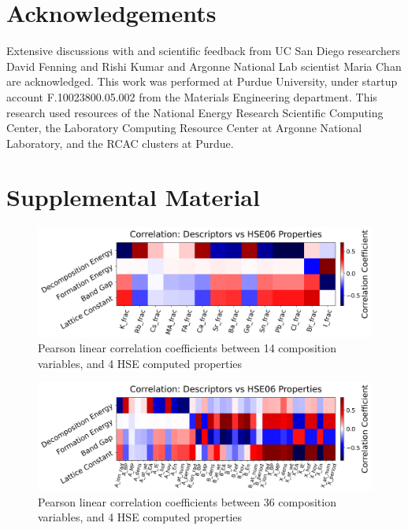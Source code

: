 \documentclass[twoside, twocolumn, 9pt, draft]{article}
\begin{document}
\section*{Acknowledgements}
\label{sec:org5936278}
Extensive discussions with and scientific feedback from UC San Diego
researchers David Fenning and Rishi Kumar and Argonne National Lab
scientist Maria Chan are acknowledged. This work was performed at
Purdue University, under startup account F.10023800.05.002 from the
Materials Engineering department. This research used resources of the
National Energy Research Scientific Computing Center, the Laboratory
Computing Resource Center at Argonne National Laboratory, and the RCAC
clusters at Purdue.



\section*{Supplemental Material}
\label{sec:org26363f8}
\printglossaries

\begin{figure}
\centering
\includegraphics[width=.9\linewidth]{./expval/HSE_v_comp_pearson2.png}
\caption{\label{fig:pearson_hcomp} Pearson linear correlation coefficients between 14 composition variables, and 4 HSE computed properties}
\end{figure}

\begin{figure}
\centering
\includegraphics[width=.9\linewidth]{./expval/HSE_v_site_prop_pearson.png}
\caption{\label{fig:pearson_hsite} Pearson linear correlation coefficients between 36 composition variables, and 4 HSE computed properties}
\end{figure}
\end{document}
